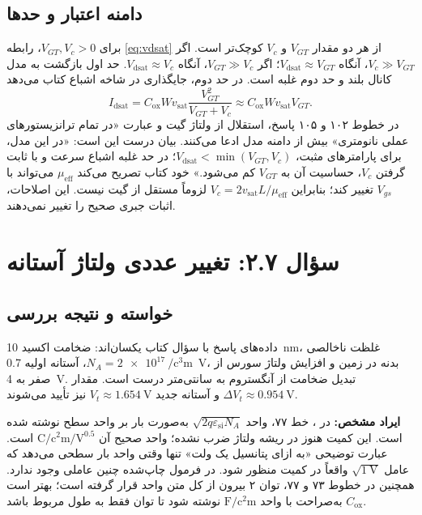 \documentclass[12pt,a4paper]{article}
\newcommand{\exnum}[1]{\mbox{\beginL#1\endL}}
\newcommand{\reviewfile}[1]{\lr{\small\texttt{#1}}}
\begin{document}
\subsection*{دامنه اعتبار و حدها}
برای \(V_{GT},V_c>0\)، رابطه \eqref{eq:vdsat} از هر دو مقدار \(V_{GT}\) و \(V_c\) کوچک‌تر است. اگر \(V_c\gg V_{GT}\)، آنگاه \(V_{\mathrm{dsat}}\approx V_{GT}\)؛ اگر \(V_{GT}\gg V_c\)، آنگاه \(V_{\mathrm{dsat}}\approx V_c\). حد اول بازگشت به مدل کانال بلند و حد دوم غلبه  است. در حد دوم، جایگذاری در شاخه اشباع کتاب می‌دهد
\begin{equation}
 I_{\mathrm{dsat}}=
 C_{\mathrm{ox}}Wv_{\mathrm{sat}}\frac{V_{GT}^2}{V_{GT}+V_c}
 \approx C_{\mathrm{ox}}Wv_{\mathrm{sat}}V_{GT}.
 \label{eq:velocity-current}
\end{equation}
در خطوط ۱۰۲ و ۱۰۵ پاسخ، استقلال از ولتاژ گیت و عبارت «در تمام ترانزیستورهای عملی نانومتری» بیش از دامنه مدل ادعا می‌کنند. بیان درست این است: «در این مدل، برای پارامترهای مثبت، \(V_{\mathrm{dsat}}<\min(V_{GT},V_c)\)؛ در حد غلبه اشباع سرعت و با ثابت گرفتن \(V_c\)، حساسیت آن به \(V_{GT}\) کم می‌شود.» خود کتاب تصریح می‌کند \(\mu_{\mathrm{eff}}\) می‌تواند با \(V_{gs}\) تغییر کند؛ بنابراین \(V_c=2v_{\mathrm{sat}}L/\mu_{\mathrm{eff}}\) لزوماً مستقل از گیت نیست. این اصلاحات، اثبات جبری صحیح را تغییر نمی‌دهند.

\section*{سؤال \exnum{۲.۷}: تغییر عددی ولتاژ آستانه}
\subsection*{خواسته و نتیجه بررسی}
داده‌های پاسخ با سؤال کتاب یکسان‌اند: ضخامت اکسید \qty{10}{\nano\metre}، غلظت ناخالصی \(N_A=\qty{2e17}{\per\cubic\centi\metre}\)، آستانه اولیه \qty{0.7}{\volt}، بدنه در زمین و افزایش ولتاژ سورس از صفر به \qty{4}{\volt}. تبدیل ضخامت از آنگستروم به سانتی‌متر درست است. مقدار \(\Delta V_t\approx\qty{0.954}{\volt}\) و آستانه جدید \(V_t\approx\qty{1.654}{\volt}\) نیز تأیید می‌شوند.

\textbf{ایراد مشخص:} در \reviewfile{2/solutions/2-7.tex}، خط ۷۷، واحد \(\sqrt{2q\varepsilon_{\mathrm{si}}N_A}\) به‌صورت بار بر واحد سطح نوشته شده است. این کمیت هنوز در ریشه ولتاژ ضرب نشده؛ واحد صحیح آن \(\unit{\coulomb\per\square\centi\metre\per\volt\tothe{0.5}}\) است. عبارت توضیحی «به ازای پتانسیل یک ولت» تنها وقتی واحد بار سطحی می‌دهد که عامل \(\sqrt{\qty{1}{\volt}}\) واقعاً در کمیت منظور شود. در فرمول چاپ‌شده چنین عاملی وجود ندارد. همچنین در خطوط ۷۳ و ۷۷، توان ۲ بیرون از کل متن واحد قرار گرفته است؛ بهتر است \(C_{\mathrm{ox}}\) به‌صراحت با واحد \(\unit{\farad\per\square\centi\metre}\) نوشته شود تا توان فقط به طول مربوط باشد.
\end{document}
